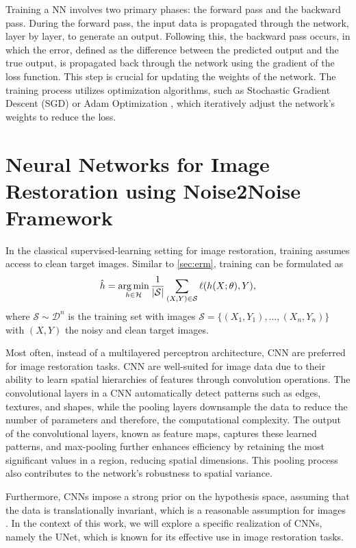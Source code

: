 Training a \gls{NN} involves two primary phases: the forward pass and the backward pass. During the forward pass, the input data is propagated through the network, layer by layer, to generate an output. Following this, the backward pass occurs, in which the error, defined as the difference between the predicted output and the true output, is propagated back through the network using the gradient of the loss function. This step is crucial for updating the weights of the network.
The training process utilizes optimization algorithms, such as Stochastic Gradient Descent (SGD) \cite{sutskeverImportanceInitializationMomentum2013} or Adam Optimization \cite{kingmaAdamMethodStochastic2017}, which iteratively adjust the network's weights to reduce the loss.

\section{Neural Networks for Image Restoration using Noise2Noise Framework}
In the classical supervised-learning setting for image restoration, training assumes access to clean target images. Similar to \cref{sec:erm}, training can be formulated as
\begin{equation}
    \hat{h} = \operatorname*{arg\,min}_{h \in \mathcal{H}} \frac{1}{\lvert \mathcal{S} \rvert} \sum_{(X, Y) \in \mathcal{S}} \ell(h(X; \theta), Y),
\end{equation}
where $\mathcal{S} \sim \mathcal{D}^n$ is the training set with images $\mathcal{S} = \{(X_1, Y_1), \dots, (X_n, Y_n)\}$ with $(X, Y)$  the noisy and clean target images.

Most often, instead of a multilayered perceptron architecture, \gls{CNN} are preferred for image restoration tasks. \gls{CNN} are well-suited for image data due to their ability to learn spatial hierarchies of features through convolution operations. The convolutional layers in a \gls{CNN} automatically detect patterns such as edges, textures, and shapes, while the pooling layers downsample the data to reduce the number of parameters and therefore, the computational complexity. The output of the convolutional layers, known as feature maps, captures these learned patterns, and max-pooling further enhances efficiency by retaining the most significant values in a region, reducing spatial dimensions. This pooling process also contributes to the network’s robustness to spatial variance. 

Furthermore, \glspl{CNN} impose a strong prior on the hypothesis space, assuming that the data is translationally invariant, which is a reasonable assumption for images \cite{goodfellowDeepLearning2016}. In the context of this work, we will explore a specific realization of \glspl{CNN}, namely the UNet, which is known for its effective use in image restoration tasks.

